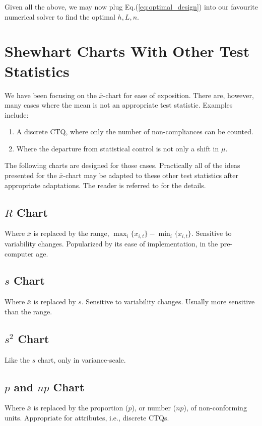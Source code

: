 \documentclass[12pt,a4paper]{report}
\theoremstyle{plain}
\theoremstyle{definition}
\newcommand{\set}[1]{\{ #1 \}} \newcommand{\setII}[1]{\left\{ #1 \right\}} \newcommand{\rv}[1]{\mathbf{#1}} \newcommand{\x}{\rv x} \newcommand{\y}{\rv y} \newcommand{\U}{\rv u} \newcommand{\T}{\rv t} \newcommand{\X}{\rv X} \newcommand{\Y}{\rv Y} \newcommand{\expect}[1]{\mathbf{E}\left[ #1 \right]} \newcommand{\expectg}[2]{\mathbf{E}_{\rv{#1}}\left[ \rv{#2} \right]} \newcommand{\expectn}[1]{\mathbb{E}\left[#1\right]} \newcommand{\cov}[1]{\mathbf{Cov} \left[ #1 \right]} \newcommand{\var}[1]{\mathop{Var} \left[ #1 \right]} \newcommand{\covn}[1]{\mathbb{Cov} \left[ #1 \right]} \newcommand{\gauss}[1]{\mathcal{N}\left(#1\right)} \newcommand{\cdf}[2]{F_{#1} (#2)} \newcommand{\survive}[2]{S_{#1} (#2)} \newcommand{\hazard}[2]{h_{#1} (#2)} \newcommand{\cuhazard}[2]{H_{#1} (#2)} \newcommand{\cdfn}[2]{\mathbb{F}_{#1}(#2)} \newcommand{\icdf}[2]{F_\rv{#1}^{-1} (#2)} \newcommand{\icdfn}[2]{\mathbb{F}^{-1}_{#1}(#2)} \newcommand{\pdf}[2]{p_{#1} (#2)} \newcommand{\prob}[1]{P\left( #1 \right)} \newcommand{\dist}{P} \newcommand{\density}{p}
\newcommand{\barxChart}{$\bar{x}$-chart }
\newcommand{\arm}{L}
\begin{document}
Given all the above, we may now plug Eq.(\ref{eq:optimal_design}) into our favourite numerical solver to find the optimal $h,\arm,n$.



\section{Shewhart Charts With Other Test Statistics}

We have been focusing on the \barxChart for ease of exposition. There are, however, many cases where the mean is not an appropriate test statistic.
Examples include:
\begin{enumerate}
\item A discrete CTQ, where only the number of non-compliances can be counted. 
\item Where the departure from statistical control is not only a shift in $\mu$.
\end{enumerate}

The following charts are designed for those cases. 
Practically all of the ideas presented for the \barxChart may be adapted to these other test statistics after appropriate adaptations. 
The reader is referred to \cite{montgomery_introduction_2007} for the details. 

\label{sec:other_control_charts}
\subsection{$R$ Chart}
Where $\bar{x}$ is replaced by the range, $\max_i\set{x_{i,t}}-\min_i\set{x_{i,t}}$.
Sensitive to variability changes. 
Popularized by its ease of implementation, in the pre-computer age. 
\subsection{$s$ Chart}
Where $\bar{x}$ is replaced by $s$. 
Sensitive to variability changes. 
Usually more sensitive than the range.
\subsection{$s^2$ Chart}
Like the $s$ chart, only in variance-scale.
\subsection{$p$ and $np$ Chart}
Where $\bar{x}$ is replaced by the proportion ($p$), or number ($np$), of non-conforming units.
Appropriate for attributes, i.e., discrete CTQs.
\end{document}
